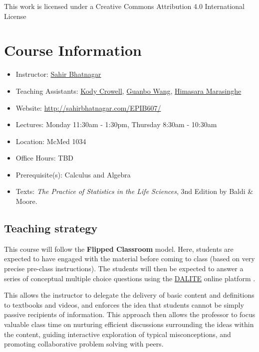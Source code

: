 \documentclass[]{book}
\providecommand{\tightlist}{%
  \setlength{\itemsep}{0pt}\setlength{\parskip}{0pt}}
\providecommand{\tightlist}{%
  \setlength{\itemsep}{0pt}\setlength{\parskip}{0pt}}
\theoremstyle{definition}
\theoremstyle{definition}
\theoremstyle{definition}
\theoremstyle{remark}
\begin{document}
This work is licensed under a Creative Commons Attribution 4.0
International License

\chapter*{Course Information}\label{course-information}

\begin{itemize}
\tightlist
\item
  Instructor: \href{mailto:sahir.bhatnagar@mcgill.ca}{Sahir Bhatnagar}\\
\item
  Teaching Assistants: \href{mailto:kody.crowell1598@gmail.com}{Kody
  Crowell}, \href{mailto:guanbo.wang@mail.mcgill.ca}{Guanbo Wang},
  \href{mailto:dewdunee.marasinghe@mail.mcgill.ca}{Himasara
  Marasinghe}\\
\item
  Website: \url{http://sahirbhatnagar.com/EPIB607/}\\
\item
  Lectures: Monday 11:30am - 1:30pm, Thursday 8:30am - 10:30am\\
\item
  Location: McMed 1034\\
\item
  Office Hours: TBD\\
\item
  Prerequisite(s): Calculus and Algebra\\
\item
  Texts: \emph{The Practice of Statistics in the Life Sciences}, 3nd
  Edition by Baldi \& Moore.
\end{itemize}

\section*{Teaching strategy}\label{teaching-strategy}

This course will follow the \textbf{Flipped Classroom} model. Here,
students are expected to have engaged with the material before coming to
class (based on very precise pre-class instructions). The students will
then be expected to answer a series of conceptual multiple choice
questions using the
\href{https://mydalite.org/en/live/signup/form/NTc4}{DALITE} online
platform \citep{bhatnagar2016dalite}.

This allows the instructor to delegate the delivery of basic content and
definitions to textbooks and videos, and enforces the idea that students
cannot be simply passive recipients of information. This approach then
allows the professor to focus valuable class time on nurturing efficient
discussions surrounding the ideas within the content, guiding
interactive exploration of typical misconceptions, and promoting
collaborative problem solving with peers.
\end{document}
